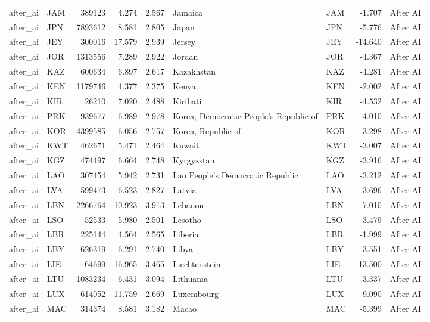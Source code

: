 \begin{tabular}{llrrrllrl}
after\_ai & JAM & 389123 & 4.274 & 2.567 & Jamaica & JAM & -1.707 & After AI \\
after\_ai & JPN & 7893612 & 8.581 & 2.805 & Japan & JPN & -5.776 & After AI \\
after\_ai & JEY & 300016 & 17.579 & 2.939 & Jersey & JEY & -14.640 & After AI \\
after\_ai & JOR & 1313556 & 7.289 & 2.922 & Jordan & JOR & -4.367 & After AI \\
after\_ai & KAZ & 600634 & 6.897 & 2.617 & Kazakhstan & KAZ & -4.281 & After AI \\
after\_ai & KEN & 1179746 & 4.377 & 2.375 & Kenya & KEN & -2.002 & After AI \\
after\_ai & KIR & 26210 & 7.020 & 2.488 & Kiribati & KIR & -4.532 & After AI \\
after\_ai & PRK & 939677 & 6.989 & 2.978 & Korea, Democratic People's Republic of & PRK & -4.010 & After AI \\
after\_ai & KOR & 4399585 & 6.056 & 2.757 & Korea, Republic of & KOR & -3.298 & After AI \\
after\_ai & KWT & 462671 & 5.471 & 2.464 & Kuwait & KWT & -3.007 & After AI \\
after\_ai & KGZ & 474497 & 6.664 & 2.748 & Kyrgyzstan & KGZ & -3.916 & After AI \\
after\_ai & LAO & 307454 & 5.942 & 2.731 & Lao People's Democratic Republic & LAO & -3.212 & After AI \\
after\_ai & LVA & 599473 & 6.523 & 2.827 & Latvia & LVA & -3.696 & After AI \\
after\_ai & LBN & 2266764 & 10.923 & 3.913 & Lebanon & LBN & -7.010 & After AI \\
after\_ai & LSO & 52533 & 5.980 & 2.501 & Lesotho & LSO & -3.479 & After AI \\
after\_ai & LBR & 225144 & 4.564 & 2.565 & Liberia & LBR & -1.999 & After AI \\
after\_ai & LBY & 626319 & 6.291 & 2.740 & Libya & LBY & -3.551 & After AI \\
after\_ai & LIE & 64699 & 16.965 & 3.465 & Liechtenstein & LIE & -13.500 & After AI \\
after\_ai & LTU & 1083234 & 6.431 & 3.094 & Lithuania & LTU & -3.337 & After AI \\
after\_ai & LUX & 614052 & 11.759 & 2.669 & Luxembourg & LUX & -9.090 & After AI \\
after\_ai & MAC & 314374 & 8.581 & 3.182 & Macao & MAC & -5.399 & After AI \\

\end{tabular}
